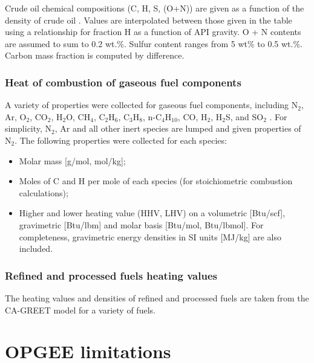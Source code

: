 \documentclass[11pt]{report}
\begin{document}
Crude oil chemical compositions (C, H, S, (O+N)) are given as a function of the density of crude oil \cite[Table 9]{Schmidt1985}. Values are interpolated between those given in the table using a relationship for fraction H as a function of API gravity. O + N contents are assumed to sum to 0.2 wt.\%. Sulfur content ranges from 5 wt\% to 0.5 wt.\%. Carbon mass fraction is computed by difference. 

\subsection{Heat of combustion of gaseous fuel components}

A variety of properties were collected for gaseous fuel components, including N$_2$, Ar, O$_2$, CO$_2$, H$_2$O, CH$_4$, C$_2$H$_6$, C$_3$H$_8$, n-C$_4$H$_{10}$, CO, H$_2$, H$_2$S, and SO$_2$ \cite[Chapter 17]{Kutz2006} \cite{Ganapathy2003}. For simplicity, N$_2$, Ar and all other inert species are lumped and given properties of N$_2$. The following properties were collected for each species:
\begin{itemize}
\item Molar mass [g/mol, mol/kg];
\item Moles of C and H per mole of each species (for stoichiometric combustion calculations);
\item Higher and lower heating value (HHV, LHV) on a volumetric [Btu/scf], gravimetric [Btu/lbm] and molar basis [Btu/mol, Btu/lbmol]. For completeness, gravimetric energy densities in SI units [MJ/kg] are also included.
\end{itemize} 

\subsection{Refined and processed fuels heating values}

The  heating values and densities of refined and processed fuels are taken from the CA-GREET model \cite{Wang2009} for a variety of fuels. 




\chapter{OPGEE limitations}
\end{document}
